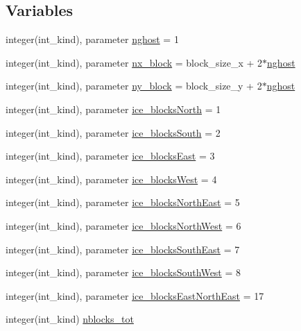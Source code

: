 \subsection*{Variables}
\begin{DoxyCompactItemize}
\item 
integer(int\_\-kind), parameter \hyperlink{namespaceice__blocks_a75dd0bf2d3d80ac626a1effa70f77a35}{nghost} = 1
\item 
integer(int\_\-kind), parameter \hyperlink{namespaceice__blocks_a130f3f9b102e86de209ee25eb36e44ba}{nx\_\-block} = block\_\-size\_\-x + 2$\ast$\hyperlink{namespaceice__blocks_a75dd0bf2d3d80ac626a1effa70f77a35}{nghost}
\item 
integer(int\_\-kind), parameter \hyperlink{namespaceice__blocks_a9ad40e7eeb19aeb81a3010e0dd997c43}{ny\_\-block} = block\_\-size\_\-y + 2$\ast$\hyperlink{namespaceice__blocks_a75dd0bf2d3d80ac626a1effa70f77a35}{nghost}
\item 
integer(int\_\-kind), parameter \hyperlink{namespaceice__blocks_a210c398febe5f3f1486ca6857c74eaef}{ice\_\-blocksNorth} = 1
\item 
integer(int\_\-kind), parameter \hyperlink{namespaceice__blocks_a99adb4e499fb158490e25611f9b2d523}{ice\_\-blocksSouth} = 2
\item 
integer(int\_\-kind), parameter \hyperlink{namespaceice__blocks_a8e54c9ed562029d5b5e55d9a5b9ed00e}{ice\_\-blocksEast} = 3
\item 
integer(int\_\-kind), parameter \hyperlink{namespaceice__blocks_a19582ab3df93a40ccf948e06353de278}{ice\_\-blocksWest} = 4
\item 
integer(int\_\-kind), parameter \hyperlink{namespaceice__blocks_aafd6325ce3debeffc94852fcb23a84ae}{ice\_\-blocksNorthEast} = 5
\item 
integer(int\_\-kind), parameter \hyperlink{namespaceice__blocks_a0f76d74a663f9c4518764417afdbcb4e}{ice\_\-blocksNorthWest} = 6
\item 
integer(int\_\-kind), parameter \hyperlink{namespaceice__blocks_a9b754927f41986abc5c81c88b55a4975}{ice\_\-blocksSouthEast} = 7
\item 
integer(int\_\-kind), parameter \hyperlink{namespaceice__blocks_a8199fdd4814a3c9865a3323bf4a484a6}{ice\_\-blocksSouthWest} = 8
\item 
integer(int\_\-kind), parameter \hyperlink{namespaceice__blocks_a84cf6b8a9b39a3d0b6c331832650fe43}{ice\_\-blocksEastNorthEast} = 17
\item 
integer(int\_\-kind) \hyperlink{namespaceice__blocks_a5b80499202c9881a6a1ff8e3375a7079}{nblocks\_\-tot}

\end{DoxyCompactItemize}
